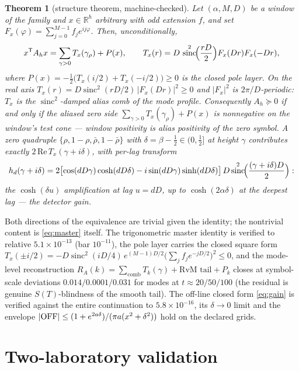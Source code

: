 \documentclass[11pt,a4paper]{article}
\newtheorem{theorem}{Theorem}
\theoremstyle{remark}
\DeclareMathOperator{\sinc}{sinc}
\begin{document}
\begin{theorem}[structure theorem, machine-checked]\label{thm:structure}
Let $(\alpha,M,D)$ be a window of the family and $x\in\mathbb R^h$
arbitrary with odd extension $f$, and set
$F_x(\varphi)=\sum_{j=0}^{M-1}f_je^{ij\varphi}$.  Then,
unconditionally,
\begin{equation}\label{eq:master}
x^{\mathsf T}A_hx=\sum_{\gamma>0}T_x(\gamma_\rho)+P(x),\qquad
T_x(r)=D\,\sinc^2\!\Bigl(\frac{rD}{2}\Bigr)F_x(Dr)F_x(-Dr),
\end{equation}
where $P(x)=-\tfrac12\bigl(T_x(i/2)+T_x(-i/2)\bigr)\ge0$ is the closed
pole layer.  On the real axis $T_x(r)=D\sinc^2(rD/2)\,|F_x(Dr)|^2\ge0$
and $|F_x|^2$ is $2\pi/D$-periodic: $T_x$ is the $\sinc^2$-damped
\emph{alias comb} of the mode profile.  Consequently $A_h\succeq0$ if
and only if the aliased zero side
$\sum_{\gamma>0}T_x(\gamma_\rho)+P(x)$ is nonnegative on the window's
test cone --- window positivity \emph{is} alias positivity of the zero
symbol.  A zero quadruple $\{\rho,1-\rho,\bar\rho,1-\bar\rho\}$ with
$\delta=\beta-\tfrac12\in(0,\tfrac12]$ at height $\gamma$ contributes
exactly $2\,\mathrm{Re}\,T_x(\gamma+i\delta)$, with per-lag transform
\begin{equation}\label{eq:gain}
h_d(\gamma+i\delta)=2\bigl[\cos(dD\gamma)\cosh(dD\delta)
-i\sin(dD\gamma)\sinh(dD\delta)\bigr]\,
D\sinc^2\!\Bigl(\frac{(\gamma+i\delta)D}{2}\Bigr):
\end{equation}
the $\cosh(\delta u)$ amplification at lag $u=dD$, up to
$\cosh(2\alpha\delta)$ at the deepest lag --- the detector gain.
\end{theorem}

Both directions of the equivalence are trivial given the identity; the
nontrivial content is \eqref{eq:master} itself.  The trigonometric
master identity is verified to relative $5.1\times10^{-13}$ (bar
$10^{-11}$), the pole layer carries the closed square form
$T_x(\pm i/2)=-D\sinc^2(iD/4)\,e^{(M-1)D/2}
\bigl(\sum_jf_je^{-jD/2}\bigr)^2\le0$, and the mode-level
reconstruction $R_A(k)=\sum_{\mathrm{comb}}T_k(\gamma)+
\text{RvM tail}+P_k$ closes at symbol-scale deviations
$0.014/0.0001/0.031$ for modes at $t\approx20/50/100$ (the residual is
genuine $S(T)$-blindness of the smooth tail).  The off-line closed form
\eqref{eq:gain} is verified against the entire continuation to
$5.8\times10^{-16}$, its $\delta\to0$ limit and the envelope
$|{\rm OFF}|\le(1+e^{2a\delta})/(\pi a(x^2+\delta^2))$ hold on the
declared grids.

\section{Two-laboratory validation}\label{sec:labs}
\end{document}
